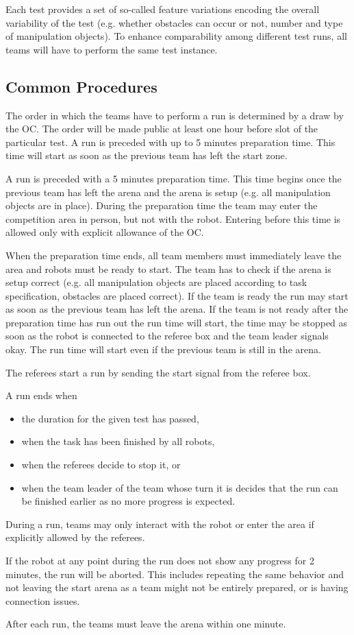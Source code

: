Each test provides a set of so-called feature variations encoding the overall variability of the test (e.g. whether obstacles can occur or not, number and type of manipulation objects). To enhance comparability among different test runs, all teams will have to perform the same test instance.


\subsection{Common Procedures} 
The order in which the teams have to perform a run is determined by a draw by the OC. The order will be made public at least one hour before slot of the particular test. A run is preceded with up to 5 minutes preparation time. This time will start as soon as the previous team has left the start zone. 
\par
A run is preceded with a 5 minutes preparation time. This time begins once the previous team has left the arena and the arena is setup (e.g. all manipulation objects are in place). During the preparation time the team may enter the competition area in person, but not with the robot. Entering before this time is allowed only with explicit allowance of the OC.
\par
When the preparation time ends, all team members must immediately leave the area and robots must be ready to start. The team has to check if the arena is setup correct (e.g. all manipulation objects are placed according to task specification, obstacles are placed correct). If the team is ready the run may start as soon as the previous team has left the arena. If the team is not ready after the preparation time has run out the run time will start, the time may be stopped as soon as the robot is connected to the referee box and the team leader signals okay. The run time will start even if the previous team is still in the arena.

\par
The referees start a run by sending the start signal from the referee box.
\par
A run ends when 
\begin{itemize}
	\item the duration for the given test has passed,
	\item when the task has been finished by all robots,
	\item when the referees decide to stop it, or 
	\item when the team leader of the team whose turn it is decides that the run can be finished earlier as no more progress is expected.
\end{itemize}
\par
During a run, teams may only interact with the robot or enter the area if explicitly allowed by the referees.
\par
If the robot at any point during the run does not show any progress for 2 minutes, the run will be aborted. This includes repeating the same behavior and not leaving the start arena as a team might not be entirely prepared, or is having connection issues.
\par
After each run, the teams must leave the arena within one minute.

